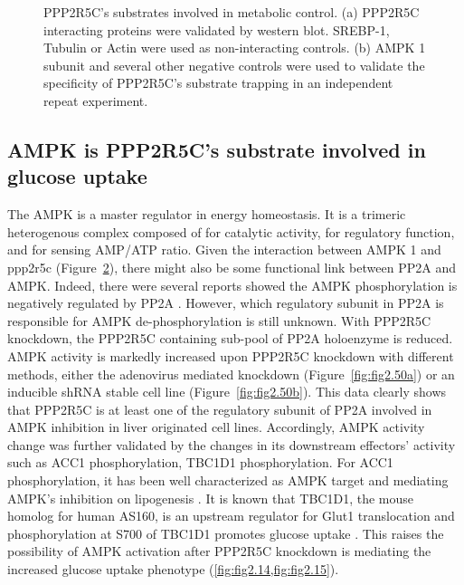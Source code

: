 \begin{figure}[!t]
\begin{subfigure}[t]{0.48\textwidth}
    \label{fig:fig2.47b}
	\end{subfigure}
\caption[Metabolic regulators as PPP2R5C's substrates]{\footnotesize PPP2R5C's substrates involved in metabolic control. (a) PPP2R5C interacting proteins were validated by western blot. SREBP-1, Tubulin or Actin were used as non-interacting controls. (b) AMPK \textbeta{}1 subunit and several other negative controls were used to validate the specificity of PPP2R5C's substrate trapping in an independent repeat experiment.}
\label{fig:fig2.47}
\end{figure}


\subsection{AMPK is PPP2R5C's substrate involved in glucose uptake}

The \gls{AMPK} is a master regulator in energy homeostasis. It is a trimeric heterogenous complex composed of \textalpha{} for catalytic activity, \textbeta{} for regulatory function, and \textgamma{} for sensing AMP/\gls{ATP} ratio. Given the interaction between \gls{AMPK} \textbeta{}1 and \gls{ppp2r5c} (Figure~\ref{fig:fig2.47}), there might also be some functional link between \gls{PP2A} and \gls{AMPK}. Indeed, there were several reports showed the \gls{AMPK} phosphorylation is negatively regulated by \gls{PP2A} \cite{park_ampk_2013,wang_pp2a_2010,wu_activation_2007}. However, which regulatory subunit in \gls{PP2A} is responsible for \gls{AMPK} de-phosphorylation is still unknown. With PPP2R5C knockdown, the PPP2R5C containing sub-pool of \gls{PP2A} holoenzyme is reduced. \gls{AMPK} activity is markedly increased upon PPP2R5C knockdown with different methods, either the adenovirus mediated knockdown (Figure~\ref{fig:fig2.50a}) or an inducible shRNA stable cell line (Figure~\ref{fig:fig2.50b}). This data clearly shows that PPP2R5C is at least one of the regulatory subunit of \gls{PP2A} involved in \gls{AMPK} inhibition in liver originated cell lines. Accordingly, \gls{AMPK} activity change was further validated by the changes in its downstream effectors' activity such as ACC1 phosphorylation, TBC1D1 phosphorylation. For ACC1 phosphorylation, it has been well characterized as AMPK target and mediating AMPK's inhibition on lipogenesis \cite{ha_critical_1994,sullivan_inhibition_1994}. It is known that TBC1D1, the mouse homolog for human AS160, is an upstream regulator for Glut1 translocation and  phosphorylation at S700 of TBC1D1 promotes glucose uptake \cite{vichaiwong_contraction_2010,zhou_akt_2008}. This raises the possibility of AMPK activation after PPP2R5C knockdown is mediating the increased glucose uptake phenotype (\cref{fig:fig2.14,fig:fig2.15}).

